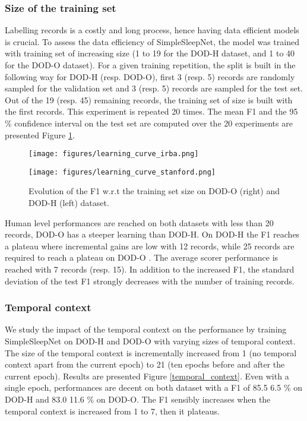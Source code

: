 \documentclass[journal]{IEEEtran}
\begin{document}
\subsubsection{Size of the training set}
Labelling records is a costly and long process, hence having data efficient models is crucial. To assess the data efficiency of SimpleSleepNet, the model was trained with training set of increasing size  (1 to 19 for the DOD-H dataset, and 1 to 40 for the DOD-O dataset). For a given training repetition, the split is built in the following way for DOD-H (resp. DOD-O), first 3 (resp. 5) records are randomly sampled for the validation set and 3 (resp. 5) records are sampled for the test set. Out of the 19 (resp. 45) remaining records, the training set of size  is built with the first  records. This experiment is repeated 20 times. The mean F1 and the 95 \% confidence interval on the test set are computed over the 20 experiments are presented Figure \ref{learning_curve_irba}.
\begin{figure}
\vspace{-2em}
    \begin{minipage}{.48\linewidth}
    \texttt{[image: figures/learning\_curve\_irba.png]} 
    \end{minipage}
    \begin{minipage}{0.48\linewidth}
    \texttt{[image: figures/learning\_curve\_stanford.png]} 
    \label{learning_curve_stanford}
    \end{minipage}
    \caption{Evolution of the F1 w.r.t the training set size on DOD-O (right) and DOD-H (left) dataset.}
    \label{learning_curve_irba}

\end{figure}
Human level performances are reached on both datasets with less than 20 records, DOD-O has a steeper learning than DOD-H. On DOD-H  the F1 reaches a plateau where incremental gains are low with 12 records, while 25 records are required to reach a plateau on DOD-O . The average scorer performance is reached with 7 records (resp. 15). In addition to the increased F1, the standard deviation of the test F1 strongly decreases with the number of training records. 

\subsubsection{Temporal context}

We study the impact of the temporal context on the performance by training SimpleSleepNet on DOD-H and DOD-O with varying sizes of temporal context. The size of the temporal context is incrementally increased from 1 (no temporal context apart from the current epoch) to 21 (ten epochs before and after the current epoch). Results are presented Figure \ref{temporal_context}. Even with a single epoch, performances are decent on both dataset with a F1 of 85.5  6.5 \% on DOD-H and 83.0  11.6 \% on DOD-O. The F1 sensibly increases when the temporal context is increased from 1 to 7, then it plateaus.
\end{document}
